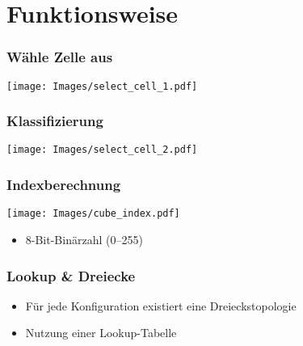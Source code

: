 \documentclass{beamer}
\begin{document}
\section{Funktionsweise}
\begin{frame}[t]
  \frametitle{Wähle Zelle aus}
  \vspace{0.8cm}
  \hspace*{-0.8cm}\texttt{[image: Images/select\_cell\_1.pdf]}
\end{frame}

\begin{frame}[t]
  \frametitle{Klassifizierung}
  \vspace{0.8cm}
  \hspace*{-0.8cm}\texttt{[image: Images/select\_cell\_2.pdf]}
\end{frame}

\begin{frame}[t]
  \frametitle{Indexberechnung}
  \begin{center}
  \vspace{-0.5cm}
  \texttt{[image: Images/cube\_index.pdf]}
  \vspace{-3cm}
  \begin{itemize}
    \item 8-Bit-Binärzahl (0–255)
  \end{itemize}
  \end{center}
\end{frame}


\begin{frame}[t]
  \frametitle{Lookup \& Dreiecke}
  \begin{center}
  \end{center}
  \begin{itemize}
    \item Für jede Konfiguration existiert eine Dreieckstopologie
    \item Nutzung einer Lookup-Tabelle
  \end{itemize}
\end{frame}
\end{document}
